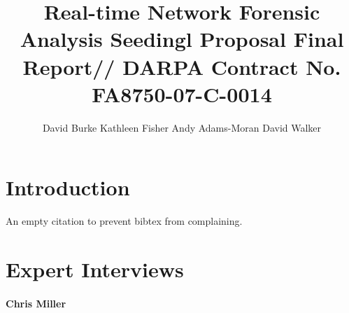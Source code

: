 \documentclass{article}
\title{Real-time Network Forensic Analysis Seedingl Proposal Final Report//
DARPA Contract No. FA8750-07-C-0014}
\author{
David Burke \qquad
Kathleen Fisher \qquad
Andy Adams-Moran \qquad
David Walker
}
\begin{document}
\maketitle{}

\section{Introduction}
\label{sec:intro}

An empty citation to prevent bibtex from complaining.~\cite{fisher+:pads}

\section{Expert Interviews}
\label{sec:interviews}

\paragraph*{Chris Miller}
\end{document}
